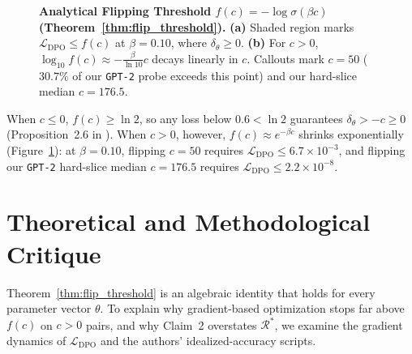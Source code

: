 \documentclass[11pt]{article}
\theoremstyle{plain}
\theoremstyle{definition}
\newcommand{\LDPO}{\mathcal{L}_{\mathrm{DPO}}}
\newcommand{\Racc}{\mathcal{R}}
\begin{document}
\begin{figure}[t]
  \caption{\textbf{Analytical Flipping Threshold $f(c) = -\log\sigma(\beta c)$ (Theorem~\ref{thm:flip_threshold}).} \textbf{(a)} Shaded region marks $\LDPO \le f(c)$ at $\beta = 0.10$, where $\delta_\theta \ge 0$. \textbf{(b)} For $c > 0$, $\log_{10} f(c) \approx -\frac{\beta}{\ln 10}c$ decays linearly in $c$. Callouts mark $c = 50$ ($30.7\%$ of our \texttt{GPT-2} probe exceeds this point) and our hard-slice median $c = 176.5$.}
  \label{fig:thm4_1_analytical}
\end{figure}

When $c \le 0$, $f(c) \ge \ln 2$, so any loss below $0.6 < \ln 2$ guarantees $\delta_\theta > -c \ge 0$ (Proposition~2.6 in \citet{chen2024preference}). When $c > 0$, however, $f(c) \approx e^{-\beta c}$ shrinks exponentially (Figure~\ref{fig:thm4_1_analytical}): at $\beta = 0.10$, flipping $c = 50$ requires $\LDPO \le 6.7 \times 10^{-3}$, and flipping our \texttt{GPT-2} hard-slice median $c = 176.5$ requires $\LDPO \le 2.2 \times 10^{-8}$.

\section{Theoretical and Methodological Critique}
\label{sec:critique}

Theorem~\ref{thm:flip_threshold} is an algebraic identity that holds for every parameter vector $\theta$. To explain why gradient-based optimization stops far above $f(c)$ on $c > 0$ pairs, and why Claim~2 overstates $\Racc^*$, we examine the gradient dynamics of $\LDPO$ and the authors' idealized-accuracy scripts.
\end{document}
